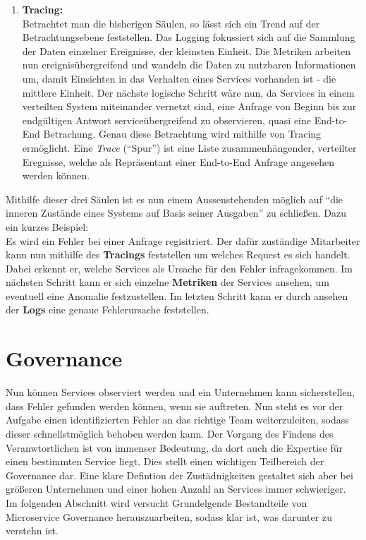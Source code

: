 \begin{definition}
	\begin{enumerate}
		\setcounter{enumi}{\value{pillarsCounter}}
		\item \textbf{Tracing:}\\
		Betrachtet man die bisherigen Säulen, so lässt sich ein Trend auf der Betrachtungsebene feststellen. Das Logging fokussiert sich auf die Sammlung der Daten einzelner Ereignisse, der kleinsten Einheit. Die Metriken arbeiten nun ereignisübergreifend und wandeln die Daten zu nutzbaren Informationen um, damit Einsichten in das Verhalten eines Services vorhanden ist - die mittlere Einheit. Der nächste logische Schritt wäre nun, da Services in einem verteilten System miteinander vernetzt sind, eine Anfrage von Beginn bis zur endgültigen Antwort serviceübergreifend zu observieren, quasi eine End-to-End Betrachung. Genau diese Betrachtung wird mithilfe von Tracing ermöglicht. Eine \textit{Trace} (\enquote{Spur}) ist eine Liste zusammenhängender, verteilter Eregnisse, welche als Repräsentant einer End-to-End Anfrage angesehen werden können.
	\end{enumerate}

\end{definition}
Mithilfe dieser drei Säulen ist es nun einem Aussenstehenden möglich auf \enquote{die inneren Zustände eines Systems auf Basis seiner Ausgaben} zu schließen. Dazu ein kurzes Beispiel:\\
Es wird ein Fehler bei einer Anfrage regisitriert. Der dafür zuständige Mitarbeiter kann nun mithilfe des \textbf{Tracings} feststellen um welches Request es sich handelt. Dabei erkennt er, welche Services als Ursache für den Fehler infragekommen. Im nächsten Schritt kann er sich einzelne \textbf{Metriken} der Services ansehen, um eventuell eine Anomalie festzustellen. Im letzten Schritt kann er durch ansehen der \textbf{Logs} eine genaue Fehlerursache feststellen.


\section{Governance}

Nun können Services observiert werden und ein Unternehmen kann sicherstellen, dass Fehler gefunden werden können, wenn sie auftreten. Nun steht es vor der Aufgabe einen identifizierten Fehler an das richtige Team weiterzuleiten, sodass dieser schnellstmöglich behoben werden kann. Der Vorgang des Findens des Veranwtortlichen ist von immenser Bedeutung, da dort auch die Expertise für einen bestimmten Service liegt. Dies stellt einen wichtigen Teilbereich der Governance dar. Eine klare Defintion der Zustädnigkeiten gestaltet sich aber bei größeren Unternehmen und einer hohen Anzahl an Services immer schwieriger. Im folgenden Abschnitt wird versucht Grundelgende Bestandteile von Microservice Governance herauszuarbeiten, sodass klar ist, was darunter zu verstehn ist.

